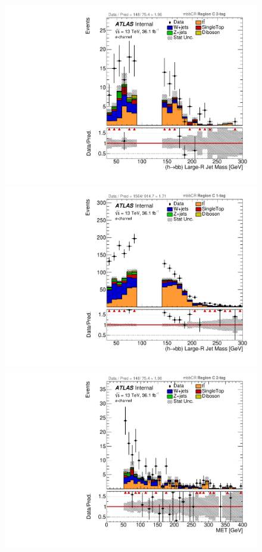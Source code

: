\begin{figure}[!htbp]
\begin{center}
\includegraphics[scale=0.23]{./figures/boosted/ABCD/elec_mbbcr_RegionC_HbbMass} 
\includegraphics[scale=0.23]{./figures/boosted/ABCD/elec_mbbcr_RegionC_1tag_HbbMass}\\
\includegraphics[scale=0.23]{./figures/boosted/ABCD/elec_mbbcr_RegionC_MET}

\end{center}
\end{figure}
